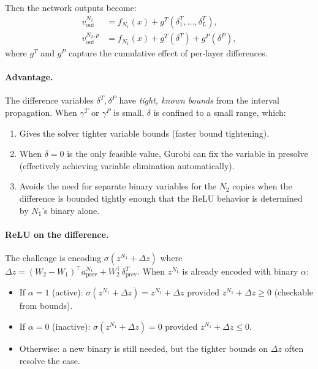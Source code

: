 \documentclass[11pt]{article}
\begin{document}
Then the network outputs become:
\begin{align}
    v_{\text{out}}^{N_2}     &= f_{N_1}(x) + g^T(\delta^T_1, \ldots, \delta^T_L), \\
    v_{\text{out}}^{N_2,p}   &= f_{N_1}(x) + g^T(\delta^T) + g^P(\delta^P),
\end{align}
where $g^T$ and $g^P$ capture the cumulative effect of per-layer differences.

\paragraph{Advantage.}
The difference variables $\delta^T, \delta^P$ have \emph{tight, known bounds}
from the interval propagation. When $\gamma^T$ or $\gamma^P$ is small,
$\delta$ is confined to a small range, which:
\begin{enumerate}
    \item Gives the solver tighter variable bounds (faster bound tightening).
    \item When $\delta = 0$ is the only feasible value, Gurobi can fix the
          variable in presolve (effectively achieving variable elimination automatically).
    \item Avoids the need for separate binary variables for the $N_2$ copies
          when the difference is bounded tightly enough that the ReLU behavior is
          determined by $N_1$'s binary alone.
\end{enumerate}

\paragraph{ReLU on the difference.}
The challenge is encoding $\sigma(z^{N_1} + \Delta z) $ where
$\Delta z = (W_2-W_1)^\top a^{N_1}_{\text{prev}} + W_2^\top \delta^T_{\text{prev}}$.
When $z^{N_1}$ is already encoded with binary $\alpha$:
\begin{itemize}
    \item If $\alpha = 1$ (active): $\sigma(z^{N_1}+\Delta z) = z^{N_1}+\Delta z$
          provided $z^{N_1}+\Delta z \ge 0$ (checkable from bounds).
    \item If $\alpha = 0$ (inactive): $\sigma(z^{N_1}+\Delta z) = 0$
          provided $z^{N_1}+\Delta z \le 0$.
    \item Otherwise: a new binary is still needed, but the tighter bounds on
          $\Delta z$ often resolve the case.
\end{itemize}
\end{document}
